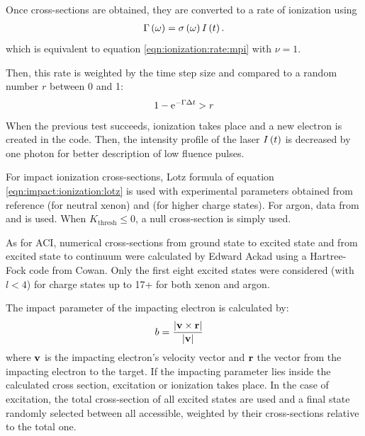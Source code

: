 Once cross-sections are obtained, they are converted to a rate of ionization
using
\begin{align}
\Gamma\left( \omega \right) = \sigma\left( \omega \right) I\left( t \right).
\label{eqn:ionization:rate:single}
\end{align}
which is equivalent to equation \eqref{eqn:ionization:rate:mpi} with $\nu = 1$.

Then, this rate is weighted\cite{Lax2006} by the time step size and compared to
a random number $r$ between 0 and 1:
\begin{align}
1 - \textrm{e}^{-\Gamma \Delta t} > r
\label{eqn:ionization:prob}
\end{align}
When the previous test succeeds, ionization takes place and a new electron is
created in the code.
Then, the intensity profile of the laser $I\left( t \right)$ is decreased
by one photon for better description of low fluence pulses.



For impact ionization cross-sections, Lotz formula of equation
\eqref{eqn:impact:ionization:lotz} is used with experimental parameters obtained
from reference \cite{Tawara1987} (for neutral xenon)
and \cite{Heidenreich2005} (for higher charge states).
For argon, data from \cite{Lotz1967} and \cite{Lotz1970} is used.
When $K_{\textrm{thresh}} \le 0$, a null cross-section is simply used.

As for ACI, numerical cross-sections from ground state to excited state and from
excited state to continuum were calculated by Edward Ackad using a
Hartree-Fock code from Cowan\cite{Cowan1981,CowanCode}. Only the first eight excited states
were considered (with $l<4$) for charge states up to 17+ for both xenon and argon.

The impact parameter of the impacting electron is calculated by:
\begin{align}
b & = \frac{\left| \textbf{v} \times \textbf{r} \right|}{\left| \textbf{v} \right|}
\label{eqn:ionization:impact:parameter}
\end{align}
where $\textbf{v}$ is the impacting electron's velocity vector and $\textbf{r}$ the vector
from the impacting electron to the target. If the impacting parameter lies
inside the calculated cross section, excitation or ionization takes place. In
the case of excitation, the total cross-section of all excited states are used
and a final state randomly selected between all accessible, weighted by their
cross-sections relative to the total one.

